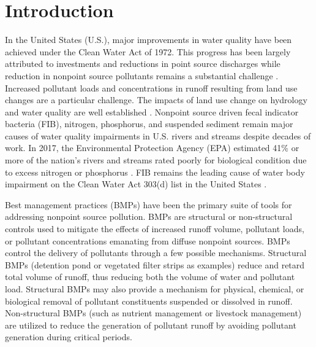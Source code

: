 \documentclass[utf8]{FrontiersinHarvard}
\begin{document}
\hypertarget{introduction}{%
\section{Introduction}\label{introduction}}

In the United States (U.S.), major improvements in water quality have been achieved under the Clean Water Act of 1972.
This progress has been largely attributed to investments and reductions in point source discharges while reduction in nonpoint source pollutants remains a substantial challenge \citep{nationalresearchcouncilAssessingTMDLApproach2001, benhamLessonsLearnedTMDL2008, schrammTotalMaximumDaily2022}.
Increased pollutant loads and concentrations in runoff resulting from land use changes are a particular challenge.
The impacts of land use change on hydrology and water quality are well established \citep{allanLandscapesRiverscapesInfluence2004, carpenterNonpointPollutionSurface1998, bernhardtUnderstandingManagingMinimizing2008, careyEvaluatingNutrientImpacts2013, freemanImpactsUrbanizationDevelopment2019}.
Nonpoint source driven fecal indicator bacteria (FIB), nitrogen, phosphorus, and suspended sediment remain major causes of water quality impairments in U.S. rivers and streams despite decades of work.
In 2017, the Environmental Protection Agency (EPA) estimated 41\% or more of the nation's rivers and streams rated poorly for biological condition due to excess nitrogen or phosphorus \citep{epaNationalWaterQuality2017}.
FIB remains the leading cause of water body impairment on the Clean Water Act 303(d) list in the United States \citep{epaNationalWaterQuality2017}.

Best management practices (BMPs) have been the primary suite of tools for addressing nonpoint source pollution.
BMPs are structural or non-structural controls used to mitigate the effects of increased runoff volume, pollutant loads, or pollutant concentrations emanating from diffuse nonpoint sources.
BMPs control the delivery of pollutants through a few possible mechanisms.
Structural BMPs (detention pond or vegetated filter strips as examples) reduce and retard total volume of runoff, thus reducing both the volume of water and pollutant load.
Structural BMPs may also provide a mechanism for physical, chemical, or biological removal of pollutant constituents suspended or dissolved in runoff.
Non-structural BMPs (such as nutrient management or livestock management) are utilized to reduce the generation of pollutant runoff by avoiding pollutant generation during critical periods.
\end{document}
